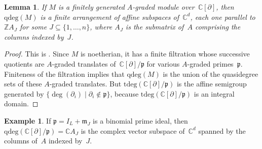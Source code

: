 \documentclass[12pt]{amsart}
\numberwithin{equation}{section}
\newtheorem{lemma}[thm]{Lemma}
\theoremstyle{definition}
\newtheorem{example}[thm]{Example}
\begin{document}
\begin{lemma}\label{l:Z}
If $M$ is a finitely generated $A$-graded module over~${\mathbb{C}}[{\partial}]$,
then ${\mathrm{qdeg}}(M)$ is a finite arrangement of affine subspaces
of~${\mathbb{C}}^d$, each one parallel to~${\mathbb{Z}} A_J$ for some $J \subseteq
\{1,\ldots,n\}$, where $A_J$ is the submatrix of~$A$ comprising the
columns indexed by~$J$.
\end{lemma}
\begin{proof}
This is \cite[Lemma~2.5]{dmm}.  Since $M$ is noetherian, it has a
finite filtration whose successive quotients are $A$-graded translates
of~${\mathbb{C}}[{\partial}]/{\mathfrak{p}}$ for various $A$-graded primes~${\mathfrak{p}}$.  Finiteness of
the filtration implies that ${\mathrm{qdeg}}(M)$ is the union of the quasidegree
sets of these $A$-graded translates.  But ${\mathrm{tdeg}}({\mathbb{C}}[{\partial}]/{\mathfrak{p}})$ is
the affine semigroup generated by $\{\deg({\partial}_i) \mid {\partial}_i \notin
{\mathfrak{p}}\}$, because ${\mathrm{tdeg}}({\mathbb{C}}[{\partial}]/{\mathfrak{p}})$ is an integral domain.
\end{proof}

\begin{example}
If ${\mathfrak{p}} = I_L + {\mathfrak{m}}_J$ is a binomial prime ideal, then
${\mathrm{qdeg}}({\mathbb{C}}[{\partial}]/{\mathfrak{p}}) = {\mathbb{C}} A_J$ is the complex vector subspace
of~${\mathbb{C}}^d$ spanned by the columns of~$A$ indexed by~$J$.
\end{example}
\end{document}
